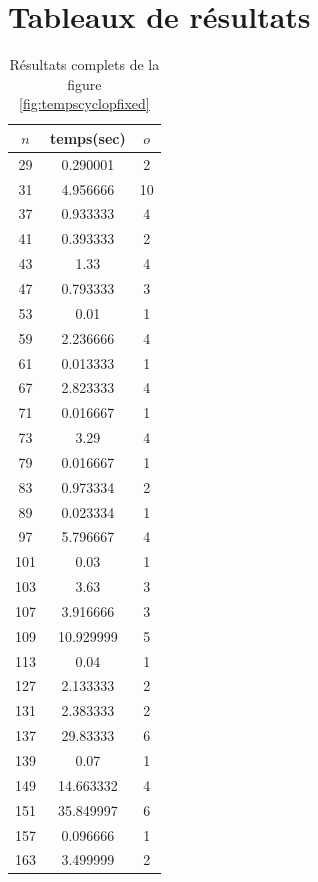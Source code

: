 \documentclass[a4paper]{article} %
\numberwithin{section}{part}
\numberwithin{equation}{section}
\begin{document}
\section{Tableaux de résultats}
\label{tableau}
\begin{table}[H]
\centering
\begin{tabular}{|c|c|c|}
\hline
$n$ & temps(sec) & $o$\\
\hline
\hline
29 & 0.290001&  2\\
\hline
31&  4.956666 & 10\\
\hline
37&  0.933333 & 4\\
\hline
41 & 0.393333 & 2\\
\hline
43 & 1.33 & 4\\
\hline
47 & 0.793333&  3\\
\hline
53 & 0.01 & 1\\
\hline
59 & 2.236666 & 4\\
\hline
61 & 0.013333 & 1\\
\hline
67 & 2.823333 & 4\\
\hline
71 & 0.016667 & 1\\
\hline
73 & 3.29 & 4\\
\hline
79 & 0.016667 & 1\\
\hline
83 & 0.973334 & 2\\
\hline
89 & 0.023334 & 1\\
\hline
97 & 5.796667 & 4\\
\hline
101 & 0.03 & 1\\
\hline
103 &3.63& 3\\
\hline
107 & 3.916666 & 3\\
\hline
109 & 10.929999 & 5\\
\hline
113 & 0.04 & 1\\
\hline
127 & 2.133333 & 2\\
\hline
131 & 2.383333 & 2\\
\hline
137 & 29.83333 & 6\\
\hline
139  &0.07 & 1\\
\hline
149 & 14.663332 & 4\\
\hline
151  &35.849997 & 6\\
\hline
157 & 0.096666 & 1\\
\hline
163 & 3.499999 & 2\\
\hline
\end{tabular}
\caption{Résultats complets de la figure \ref{fig:tempscyclopfixed}}
\end{table}
\end{document}
